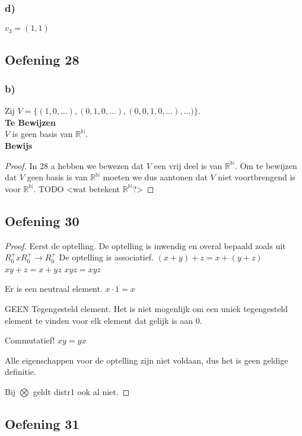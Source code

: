 \documentclass[lineaire_algebra_oplossingen.tex]{subfiles}
\begin{document}
\subsubsection*{d)}
$v_3 = (1,1)$

\subsection{Oefening 28}
\subsubsection*{b)}
Zij $V = \{(1,0,...),(0,1,0,...),(0,0,1,0,...),...)\}$.\\
\textbf{Te Bewijzen}\\
$V$ is geen basis van $\mathbb{R}^\mathbb{N}$.\\
\textbf{Bewijs}
\begin{proof}
In 28 a hebben we bewezen dat $V$ een vrij deel is van $\mathbb{R}^\mathbb{N}$. Om te bewijzen dat $V$ geen basis is van $\mathbb{R}^\mathbb{N}$ moeten we dus aantonen dat $V$ niet voortbrengend is voor $\mathbb{R}^\mathbb{N}$.
TODO <wat betekent $\mathbb{R}^\mathbb{N}$?>
\end{proof}

\subsection{Oefening 30}

\begin{proof}

Eerst de optelling.
De optelling is inwendig en overal bepaald zoals uit $R_{0}^{+} x R_{0}^{+} \rightarrow R_{0}^{+} $ 
De optelling is associatief.
$ (x + y) + z = x + (y+z) $
$ xy + z = x + yz$
$ xyz = xyz $

Er is een neutraal element.
$x \cdot 1 = x $

GEEN Tegengesteld element.
Het is niet mogenlijk om een uniek tegengesteld element te vinden voor elk element dat gelijk is aan 0.

Commutatief!
$xy = yx$

Alle eigenschappen voor de optelling zijn niet voldaan, dus het is geen geldige definitie.

Bij $ \bigotimes $ geldt distr1 ook al niet.

\end{proof}

\subsection{Oefening 31}
\end{document}
